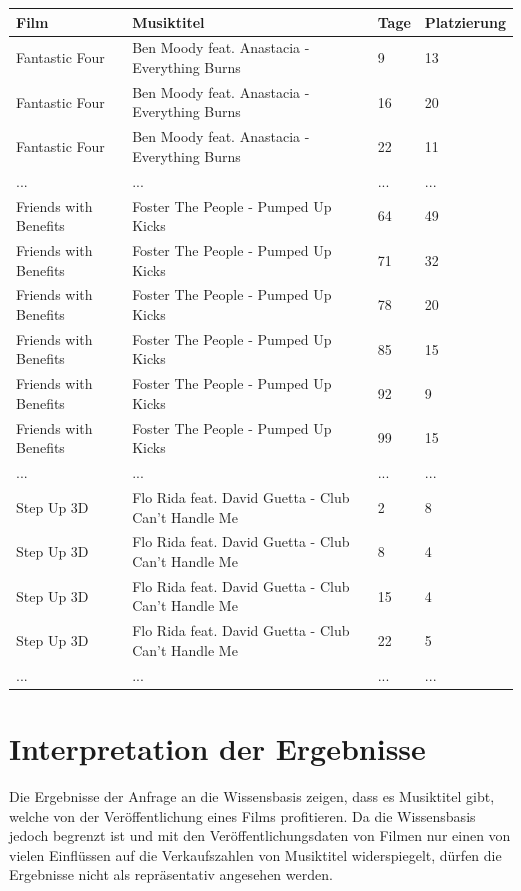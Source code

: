 \documentclass[parskip]{scrartcl}
\begin{document}
\label{tab:result}
\begin{small}
\begin{longtable}{p{}|p{}|C{0.08\textwidth}|C{0.1\textwidth}}
    \textbf{Film} & \textbf{Musiktitel} & \textbf{Tage}\footnotemark & \textbf{Platzierung} \\ \hline
    Fantastic Four & Ben Moody feat. Anastacia - Everything Burns & 9 & 13 \\
    Fantastic Four & Ben Moody feat. Anastacia - Everything Burns & 16 & 20 \\
    Fantastic Four & Ben Moody feat. Anastacia - Everything Burns & 22 & 11 \\
    ... & ... & ... & ... \\
    Friends with Benefits & Foster The People - Pumped Up Kicks & 64 & 49 \\
    Friends with Benefits & Foster The People - Pumped Up Kicks & 71 & 32 \\
    Friends with Benefits & Foster The People - Pumped Up Kicks & 78 & 20 \\
    Friends with Benefits & Foster The People - Pumped Up Kicks & 85 & 15 \\
    Friends with Benefits & Foster The People - Pumped Up Kicks & 92 & 9 \\
    Friends with Benefits & Foster The People - Pumped Up Kicks & 99 & 15 \\
    ... & ... & ... & ... \\    
    Step Up 3D & Flo Rida feat. David Guetta - Club Can't Handle Me & 2 & 8 \\
    Step Up 3D & Flo Rida feat. David Guetta - Club Can't Handle Me & 8 & 4 \\
    Step Up 3D & Flo Rida feat. David Guetta - Club Can't Handle Me & 15 & 4 \\
    Step Up 3D & Flo Rida feat. David Guetta - Club Can't Handle Me & 22 & 5 \\
    ... & ... & ... & ... \\
\end{longtable}
\end{small}
    
\section{Interpretation der Ergebnisse}

Die Ergebnisse der Anfrage an die Wissensbasis zeigen, dass es Musiktitel gibt, welche von der Veröffentlichung eines Films profitieren. Da die Wissensbasis jedoch begrenzt ist und mit den Veröffentlichungsdaten von Filmen nur einen von vielen Einflüssen auf die Verkaufszahlen von Musiktitel widerspiegelt, dürfen die Ergebnisse nicht als repräsentativ angesehen werden.
\end{document}
